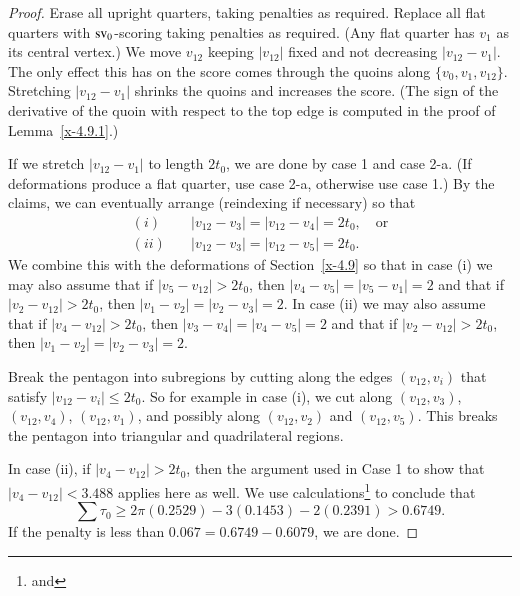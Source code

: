 \begin{proof}
Erase all upright quarters, taking penalties as required.  Replace
all flat quarters with ${\operatorname{sv}}_0$-scoring taking penalties as
required. (Any flat quarter has $v_1$ as its central vertex.) We
move $v_{12}$ keeping $|v_{12}|$ fixed and not decreasing
$|v_{12}-v_1|$.  The only effect this has on the score comes
through the quoins along $\{v_0,v_1,v_{12}\}$. Stretching
$|v_{12}-v_1|$ shrinks the quoins and increases the score. (The
sign of the derivative of the quoin with respect to the top edge
is computed in the proof of Lemma~\ref{x-4.9.1}.)

If we stretch $|v_{12}-v_1|$ to length $2t_0$, we are done by case
1 and case 2-a. (If deformations produce a flat quarter, use case
2-a, otherwise use case 1.) By the claims, we can eventually
arrange (reindexing if necessary) so that
$$
\begin{array}{lll}
(i)&\quad |v_{12}-v_3|=|v_{12}-v_4|=2t_0,\quad\text{or}\\
(ii)&\quad |v_{12}-v_3|=|v_{12}-v_5|=2t_0.
\end{array}
$$
We combine this with the deformations of Section~\ref{x-4.9} so
that in case (i) we may also assume that if $|v_5-v_{12}|>2t_0$,
then $|v_4-v_5|=|v_5-v_1|=2$ and that if $|v_2-v_{12}|>2t_0$, then
$|v_1-v_2|=|v_2-v_3|=2$. In case (ii) we may also assume that if
$|v_4-v_{12}|>2t_0$, then $|v_3-v_4|=|v_4-v_5|=2$ and that if
$|v_2-v_{12}|>2t_0$, then $|v_1-v_2|=|v_2-v_3|=2$.

Break the pentagon into subregions by cutting along the edges
$(v_{12},v_i)$ that satisfy $|v_{12}-v_i|\le2t_0$. So for example
in case (i), we cut along $(v_{12},v_3)$, $(v_{12},v_4)$,
$(v_{12},v_1)$, and possibly along $(v_{12},v_2)$ and
$(v_{12},v_5)$.  This breaks the pentagon into triangular and
quadrilateral regions.

In case (ii), if $|v_4-v_{12}|>2t_0$, then the argument used in
Case 1 to show that $|v_4-v_{12}|<3.488$ applies here as well.
We use
calculations\footnote{ and } to
conclude that
    $$\sum\tau_0 \ge 2\pi (0.2529) -3 (0.1453) -2 (0.2391) > 0.6749.$$
If the penalty is less than $0.067=0.6749-0.6079$, we are done.


\end{proof}
